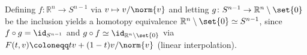 Defining $f\colon \mathbb{R}^n\to S^{n-1}$ via $v \mapsto v/\norm{v}$ and
letting $g\colon S^{n-1}\to \mathbb{R}^n\setminus\set{0}$ be the inclusion
yields a homotopy equivalence $\mathbb{R}^n\setminus\set{0}\simeq S^{n-1}$, since
$f \circ g = \id_{S^{n-1}}$ and $g \circ f\simeq \id_{\mathbb{R}^n\setminus\set{0}}$
via $F(t, v)\coloneqq tv + (1-t)v/\norm{v}$ (linear interpolation).
